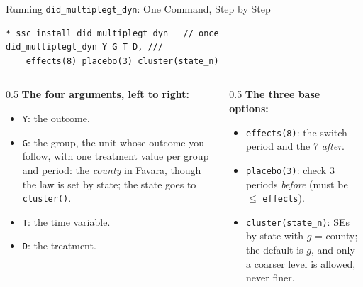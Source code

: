 \documentclass[main.tex]{subfiles}
\begin{document}
\begin{frame}[fragile]{Running \texttt{did\_multiplegt\_dyn}: One Command, Step by Step}


\begin{lstlisting}
* ssc install did_multiplegt_dyn   // once
did_multiplegt_dyn Y G T D, ///
    effects(8) placebo(3) cluster(state_n)
\end{lstlisting}

  \smallskip
  \begin{columns}[T]
    \begin{column}{0.5\textwidth}
      \textbf{The four arguments, left to right:}
      \begin{itemize}\footnotesize
        \item \texttt{Y}: the outcome.
        \item \texttt{G}: the group, the unit whose outcome you follow, with
          one treatment value per group and period: the \emph{county} in
          Favara, though the law is set by state; the state goes to
          \texttt{cluster()}.
        \item \texttt{T}: the time variable.
        \item \texttt{D}: the treatment.
      \end{itemize}
    \end{column}
    \begin{column}{0.5\textwidth}
      \textbf{The three base options:}
      \begin{itemize}\footnotesize
        \item \texttt{effects(8)}: the switch period and the 7 \emph{after}.
        \item \texttt{placebo(3)}: check 3 periods \emph{before}
          (must be $\le$ \texttt{effects}).
        \item \texttt{cluster(state\_n)}: SEs by state with $g$ = county;
          the default is $g$, and only a coarser level is allowed, never
          finer.
      \end{itemize}
    \end{column}
  \end{columns}


\end{frame}
\end{document}
